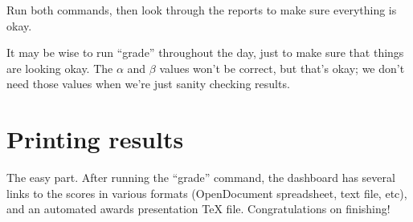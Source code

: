 Run both commands, then look through the reports to make sure everything is okay.

It may be wise to run ``grade'' throughout the day,
just to make sure that things are looking okay.
The $\alpha$ and $\beta$ values won't be correct, but that's okay;
we don't need those values when we're just sanity checking results.
\section{Printing results}
The easy part.  After running the ``grade'' command,
the dashboard has several links to the scores in various formats
(OpenDocument spreadsheet, text file, etc),
and an automated awards presentation TeX file.
Congratulations on finishing!
